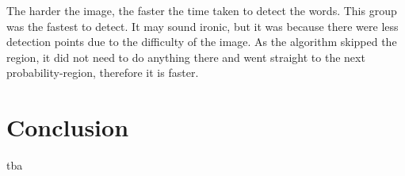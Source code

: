 \documentclass[10pt, a4paper]{article}
\begin{document}
The harder the image, the faster the time taken to detect the words. This group was the fastest to detect. It may sound ironic, but it was because there were less detection points due to the difficulty of the image. As the algorithm skipped the region, it did not need to do anything there and went straight to the next probability-region, therefore it is faster.

\section{Conclusion} %
\label{sec:conclusion}
tba
\clearpage
\newpage 


\end{document}
